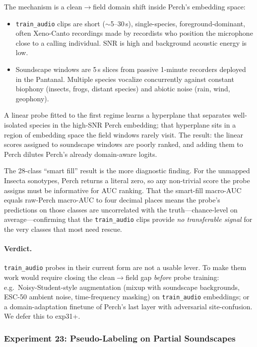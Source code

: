 The mechanism is a clean$\to$field domain shift inside Perch's
embedding space:
\begin{itemize}
\item \texttt{train\_audio} clips are short ($\sim$5--30\,s),
single-species, foreground-dominant, often Xeno-Canto recordings made by
recordists who position the microphone close to a calling individual.
SNR is high and background acoustic energy is low.
\item Soundscape windows are 5\,s slices from passive 1-minute recorders
deployed in the Pantanal. Multiple species vocalize concurrently against
constant biophony (insects, frogs, distant species) and abiotic noise
(rain, wind, geophony).
\end{itemize}
A linear probe fitted to the first regime learns a hyperplane that
separates well-isolated species in the high-SNR Perch embedding; that
hyperplane sits in a region of embedding space the field windows rarely
visit. The result: the linear scores assigned to soundscape windows are
poorly ranked, and adding them to Perch dilutes Perch's already
domain-aware logits.

The 28-class ``smart fill'' result is the more diagnostic finding. For
the unmapped Insecta sonotypes, Perch returns a literal zero, so any
non-trivial score the probe assigns must be informative for AUC ranking.
That the smart-fill macro-AUC equals raw-Perch macro-AUC to four decimal
places means the probe's predictions on those classes are uncorrelated
with the truth---chance-level on average---confirming that the
\texttt{train\_audio} clips provide \emph{no transferable signal} for
the very classes that most need rescue.

\paragraph{Verdict.}
\texttt{train\_audio} probes in their current form are not a usable
lever. To make them work would require closing the clean$\to$field gap
\emph{before} probe training: e.g.\ Noisy-Student-style augmentation
(mixup with soundscape backgrounds, ESC-50 ambient noise, time-frequency
masking) on \texttt{train\_audio} embeddings; or a domain-adaptation
finetune of Perch's last layer with adversarial site-confusion. We
defer this to exp31+.

\subsubsection{Experiment 23: Pseudo-Labeling on Partial Soundscapes}
\label{sec:exp23}

